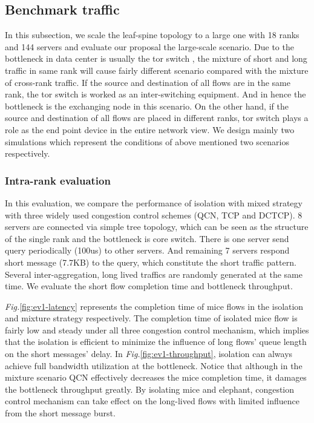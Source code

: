 \documentclass[]{sig-alternate-10pt}
\begin{document}
\subsection{Benchmark traffic}
In this subsection, we scale the leaf-spine topology to a large one with 18 ranks and 144 servers and evaluate our proposal the large-scale scenario.
Due to the bottleneck in data center is usually the tor switch \cite{vamanan2012deadline}, the mixture of short and long traffic in same rank will cause fairly different scenario compared with the mixture of cross-rank traffic. If the source and destination of all flows are in the same rank, the tor switch is worked as an inter-switching equipment. And in hence the bottleneck is the exchanging node in this scenario. On the other hand, if the source and destination of all flows are placed in different ranks, tor switch plays a role as the end point device in the entire network view. We design mainly two simulations which represent the conditions of above mentioned two scenarios respectively.
\subsubsection{Intra-rank evaluation}



In this evaluation, we compare the performance of isolation with mixed strategy with three widely used congestion control schemes (QCN, TCP and DCTCP). 8 servers are connected via simple tree topology, which can be seen as the structure of the single rank and the bottleneck is core switch. There is one server send query periodically (100us) to other servers. And remaining 7 servers respond short message (7.7KB) to the query, which constitute the short traffic pattern. Several inter-aggregation, long lived traffics are randomly generated at the same time. We evaluate the short flow completion time and bottleneck throughput. 

\emph{Fig.}\ref{fig:ev1-latency} represents the completion time of mice flows in the isolation and mixture strategy respectively. The completion time of isolated mice flow is fairly low and steady under all three congestion control mechanism, which implies that the isolation is efficient to minimize the influence of long flows' queue length on the short messages' delay. In \emph{Fig.}\ref{fig:ev1-throughput}, isolation can always achieve full bandwidth utilization at the bottleneck. Notice that although in the mixture scenario QCN effectively decreases the mice completion time, it damages the bottleneck throughput greatly. By isolating mice and elephant, congestion control mechanism can take effect on the long-lived flows with limited influence from the short message burst. 
\end{document}
